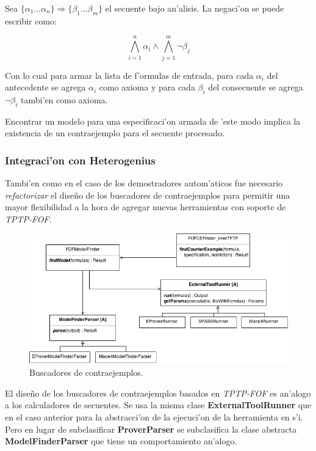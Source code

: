 Sea $\{\alpha_1 \dots \alpha_n\} \Rightarrow \{\beta_1 \dots \beta_m\}$ el secuente bajo an'alisis.
La negaci'on se puede escribir como:

\begin{equation}
\bigwedge\limits_{i=1}^n{\alpha_i} \wedge \bigwedge\limits_{j=1}^m{\neg \beta_{j}}
\end{equation}

Con lo cual para armar la lista de f'ormulas de entrada, para cada $\alpha_{i}$ del antecedente se agrega $\alpha_{i}$ como axioma y para cada $\beta_{i}$ del consecuente se agrega $\neg \beta_{i}$ tambi'en como axioma.

Encontrar un modelo para una especificaci'on armada de 'este modo implica la existencia de un contraejemplo para el secuente procesado.


\subsubsection{Integraci'on con Heterogenius}

Tambi'en como en el caso de los demostradores autom'aticos fue necesario \textit{refactorizar} el diseño de los buscadores de contraejemplos para permitir una mayor flexibilidad a la hora de agregar nuevas herramientas con soporte de \textit{TPTP-FOF}.

\begin{figure}[H]
	\includegraphics[width=450px]{img/arq_ce.png}
	\centering
	\caption{Buscadores de contraejemplos.}
\end{figure}

El diseño de los buscadores de contraejemplos basados en \textit{TPTP-FOF} es an'alogo a los calculadores de secuentes. Se usa la misma clase \textbf{ExternalToolRunner} que en el caso anterior para la abstracci'on de la ejecuci'on de la herramienta en s'i. Pero en lugar de subclasificar \textbf{ProverParser} se subclasifica la clase abstracta \textbf{ModelFinderParser} que tiene un comportamiento an'alogo.